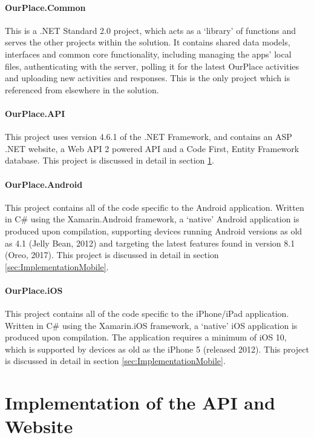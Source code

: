 \paragraph{OurPlace.Common}
This is a .NET Standard 2.0 project, which acts as a `library' of functions and
serves the other projects within the solution. It contains shared data models,
interfaces and common core functionality, including managing the apps' local
files, authenticating with the server, polling it for the latest OurPlace
activities and uploading new activities and responses. This is the only project
which is referenced from elsewhere in the solution.

\paragraph{OurPlace.API}
This project uses version 4.6.1 of the .NET Framework, and contains an ASP .NET
website, a Web API 2 powered API and a Code First, Entity Framework database.
This project is discussed in detail in section \ref{sec:ImplementationWeb}.

\paragraph{OurPlace.Android}
This project contains all of the code specific to the Android application.
Written in C\# using the Xamarin.Android framework, a `native' Android application is
produced upon compilation, supporting devices running Android versions as old as
4.1 (Jelly Bean, 2012) and targeting the latest features found in version 8.1
(Oreo, 2017). This project is discussed in detail in section
\ref{sec:ImplementationMobile}.

\paragraph{OurPlace.iOS}
This project contains all of the code specific to the iPhone/iPad application.
Written in C\# using the Xamarin.iOS framework, a `native' iOS application is
produced upon compilation. The application requires a minimum of iOS 10, which
is supported by devices as old as the iPhone 5 (released 2012). This project is
discussed in detail in section \ref{sec:ImplementationMobile}.

\section{Implementation of the API and Website}
\label{sec:ImplementationWeb}


